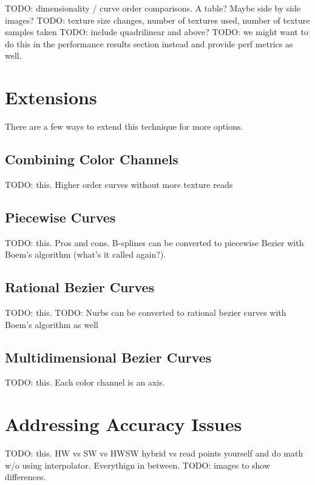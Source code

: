 \documentclass{jcgt}
\begin{document}
TODO: dimensionality / curve order comparisons. A table? Maybe side by side images?
TODO: texture size changes, number of textures used, number of texture samples taken
TODO: include quadrilinear and above?
TODO: we might want to do this in the performance results section instead and provide perf metrics as well.

\section{Extensions}
\label{sec:extensions}

There are a few ways to extend this technique for more options.

\subsection{Combining Color Channels}

TODO: this.  Higher order curves without more texture reads

\subsection{Piecewise Curves}

TODO: this.  Pros and cons. B-splines can be converted to piecewise Bezier with Boem's algorithm (what's it called again?).

\subsection{Rational Bezier Curves}

TODO: this.
TODO: Nurbs can be converted to rational bezier curves with Boem's algorithm as well

\subsection{Multidimensional Bezier Curves}

TODO: this.  Each color channel is an axis.

\section{Addressing Accuracy Issues}
\label{sec:addressingaccuracyissues}

TODO: this. HW vs SW vs HWSW hybrid vs read points yourself and do math w/o using interpolator. Everythign in between.
TODO: images to show differences.
\end{document}
